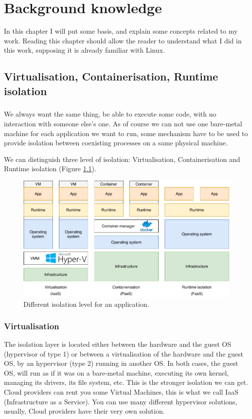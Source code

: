 \chapter{Background knowledge}

In this chapter I will put some basis, and explain some concepts related to my work.  Reading this chapter should allow the reader to understand what I did in this work, supposing it is already familiar with Linux.

\section{Virtualisation, Containerisation, Runtime isolation}
\paragraph{}We always want the same thing, be able to execute some code, with no interaction with someone else's one.  As of course we can not use one bare-metal machine for each application we want to run, some mechanism have to be used to provide isolation between coexisting processes on a same physical machine.

We can distinguish three level of isolation: Virtualisation, Containerisation and Runtime isolation (Figure \ref{fig:virt-cont-runt}).
\begin{figure}
  \begin{center}
    \includegraphics[width=\linewidth]{images/Virt-Cont-Runt.pdf}
    \caption{Different isolation level for an application.}
    \label{fig:virt-cont-runt}
  \end{center}
\end{figure}
\subsection{Virtualisation}
The isolation layer is located either between the hardware and the guest OS (hypervisor of type 1) or between a virtualisation of the hardware and the guest OS, by an hypervisor (type 2) running in another OS.  In both cases, the guest OS, will run as if it was on a bare-metal machine, executing its own kernel, managing its drivers, its file system, etc.  This is the stronger isolation we can get.  Cloud providers can rent you some Virtual Machines, this is what we call IaaS (Infrastructure as a Service).  You can use many different hypervisor solutions, usually, Cloud providers have their very own solution.

